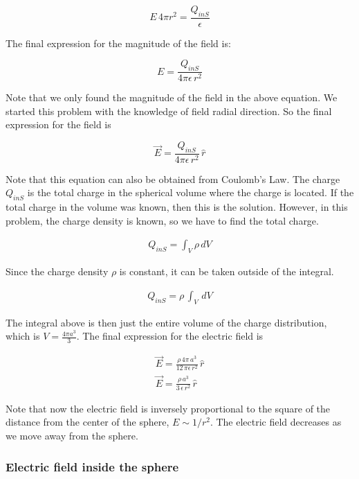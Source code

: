 \documentclass{ximera}
\begin{document}
\begin{equation}
 E \, 4 \pi r^2 = \frac{Q_{inS}}{\epsilon}
\end{equation}

The final expression for the magnitude of the field is:


\begin{equation}
 E  = \frac{Q_{inS}}{4 \pi  \epsilon \, r^2}
\end{equation}

Note that we only found the magnitude of the field in the above equation. We started this problem with the knowledge of field radial direction. So the final expression for the field is

\begin{equation}
 \vec{E}  = \frac{Q_{inS}}{4 \pi  \epsilon \, r^2} \, \hat{r}
\end{equation}

Note that this equation can also be obtained from Coulomb's Law. The charge $Q_{inS}$ is the total charge in the spherical volume where the charge is located. If the total charge in the volume was known, then this is the solution. However, in this problem, the charge density is known, so we have to find the total charge.

\begin{eqnarray}
Q_{inS}=\int_V \rho \, dV
\end{eqnarray}

Since the charge density $\rho$ is constant, it can be taken outside of the integral.


\begin{eqnarray}
Q_{inS}=\rho \, \int_V \, dV
\end{eqnarray}

The integral above is then just the entire volume of the charge distribution, which is $V=\frac{4 \pi a^3}{3}$. The final expression for the electric field is 


\begin{eqnarray}
 \vec{E}  = \frac{\rho \, 4 \pi \, a^3}{12 \, \pi  \epsilon \, r^2} \, \hat{r} \\
 \vec{E}  = \frac{\rho \,   a^3}{3  \, \epsilon \, r^2} \, \hat{r}
\end{eqnarray}


Note that now the electric field is inversely proportional to the square of the distance from the center of the sphere, $E \sim 1/r^2$. The electric field decreases as we move away from the sphere.

\subsubsection{Electric field inside the sphere}
\end{document}
